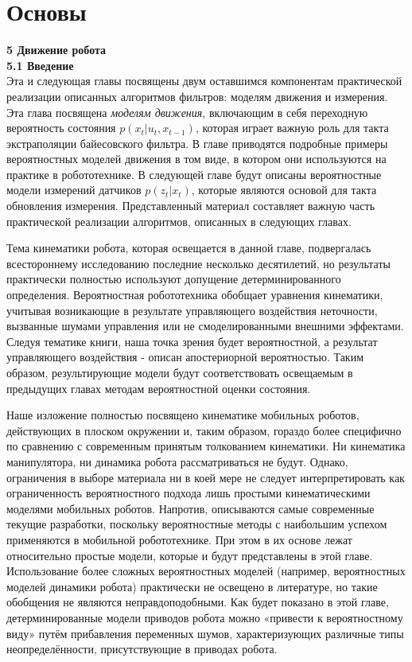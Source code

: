\documentclass[10pt,a4paper]{article}
\begin{document}
\part{Основы}



\textbf{5 Движение робота}\\

\textbf{5.1 Введение}\\

Эта и следующая главы посвящены двум оставшимся компонентам практической реализации описанных алгоритмов фильтров: моделям движения и измерения. Эта глава посвящена \textit{моделям движения},  включающим в себя переходную вероятность состояния $p(x_t | u_t, x_{t-1})$, которая играет важную роль для такта экстраполяции байесовского фильтра. В главе приводятся подробные примеры вероятностных моделей движения в том виде, в котором они используются на практике в робототехнике. В следующей главе будут описаны вероятностные модели измерений датчиков $p(z_t | x_t)$, которые являются основой для такта обновления измерения. Представленный материал составляет важную часть практической реализации алгоритмов, описанных в следующих главах. 

Тема кинематики робота, которая освещается в данной главе, подвергалась всестороннему исследованию последние несколько десятилетий, но результаты практически полностью используют допущение детерминированного определения. Вероятностная робототехника обобщает уравнения кинематики, учитывая возникающие в результате управляющего воздействия неточности, вызванные шумами управления или не смоделированными внешними эффектами. Следуя тематике книги, наша точка зрения будет вероятностной, а результат управляющего воздействия - описан апостериорной вероятностью. Таким образом, результирующие модели будут соответствовать освещаемым в предыдущих главах методам вероятностной оценки состояния. 

Наше изложение полностью посвящено кинематике мобильных роботов, действующих в плоском окружении и, таким образом, гораздо более специфично по сравнению с современным принятым толкованием кинематики. Ни кинематика манипулятора, ни динамика робота рассматриваться не будут. Однако, ограничения в выборе материала ни в коей мере не следует интерпретировать как ограниченность вероятностного подхода лишь простыми кинематическими моделями мобильных роботов. Напротив, описываются самые современные текущие разработки, поскольку вероятностные методы с наибольшим успехом применяются в мобильной робототехнике. При этом в их основе  лежат относительно простые модели, которые и будут представлены в этой главе. Использование более сложных вероятностных моделей (например, вероятностных моделей динамики робота) практически не освещено в литературе, но такие обобщения не являются неправдоподобными. Как будет показано в этой главе, детерминированные модели приводов робота можно «привести к вероятностному виду» путём прибавления переменных шумов, характеризующих различные типы неопределённости, присутствующие в приводах робота. 
\end{document}
